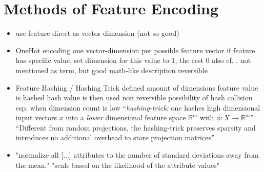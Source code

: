\section{Methods of Feature Encoding}
\begin{itemize}
	\item use feature direct as vector-dimension (not so good)
	\item OneHot encoding
		\subitem one vector-dimension per possible feature vector
		\subitem if feature has specific value, set dimension for this value to 1, the rest 0
		\subitem also cf. \textcite[][p. 12]{Eskin2002}, not mentioned as term, but good math-like description
		\subitem reversible
	\item Feature Hashing / Hashing Trick
		\subitem defined amount of dimensions
		\subitem feature value is hashed
		\subitem hash value is then used
		\subitem non reversible
		\subitem possibility of hash collision
		\subitem esp. when dimension count is low
		\subitem \enquote{\emph{hashing-trick:} one hashes high dimensional input vectors $x$ into a \emph{lower} dimensional feature space $\mathbb{R}^m$ with $\phi: X \rightarrow \mathbb{R}^m$} \parencite{Weinberger2009,Shi2009,Langford2007}
		\subitem \enquote{Different from random projections, the hashing-trick preserves sparsity and introduces no additional overhead to store projection matrices} \parencite{Weinberger2009}
	\item "normalize all [...] attributes to the number of standard deviations away from the mean." \parencite{Eskin2002}
		\subitem "scale based on the likelihood of the attribute values" \parencite{Eskin2002}
		
\end{itemize}